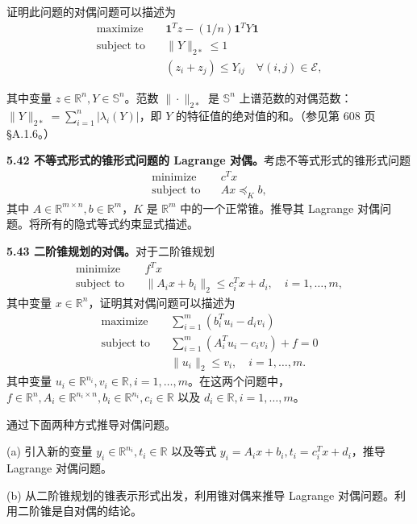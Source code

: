 \documentclass[UTF8, 12pt, fontset=fandol, oneside]{ctexart}
\begin{document}
证明此问题的对偶问题可以描述为
\[
\begin{aligned}
\text{maximize}\quad & \mathbf{1}^Tz-(1/n)\mathbf{1}^TY\mathbf{1}\\
\text{subject to}\quad & \|Y\|_{2\ast}\leq 1\\
& (z_i+z_j)\leq Y_{ij}\quad \forall (i,j)\in\mathcal{E},
\end{aligned}
\]

其中变量 $z\in\mathbb{R}^n, Y\in\mathbb{S}^n$。范数 $\|\cdot\|_{2\ast}$ 是 $\mathbb{S}^n$ 上谱范数的对偶范数：$\|Y\|_{2\ast}=\sum_{i=1}^n|\lambda_i(Y)|$，即 $Y$ 的特征值的绝对值的和。（参见第 608 页 §A.1.6。）

\noindent\textbf{5.42 不等式形式的锥形式问题的 Lagrange 对偶。}\quad 考虑不等式形式的锥形式问题
\[
\begin{aligned}
\text{minimize}\quad & c^Tx\\
\text{subject to}\quad & Ax\preceq_K b,
\end{aligned}
\]
其中 $A\in\mathbb{R}^{m\times n}, b\in\mathbb{R}^m$，$K$ 是 $\mathbb{R}^m$ 中的一个正常锥。推导其 Lagrange 对偶问题。将所有的隐式等式约束显式描述。

\noindent\textbf{5.43 二阶锥规划的对偶。}\quad 对于二阶锥规划
\[
\begin{aligned}
\text{minimize}\quad & f^Tx\\
\text{subject to}\quad & \|A_ix+b_i\|_2\leq c_i^Tx+d_i,\quad i=1,\ldots,m,
\end{aligned}
\]
其中变量 $x\in\mathbb{R}^n$，证明其对偶问题可以描述为
\[
\begin{aligned}
\text{maximize}\quad & \sum_{i=1}^m(b_i^Tu_i-d_iv_i)\\
\text{subject to}\quad & \sum_{i=1}^m(A_i^Tu_i-c_iv_i)+f=0\\
& \|u_i\|_2\leq v_i,\quad i=1,\ldots,m.
\end{aligned}
\]
其中变量 $u_i\in\mathbb{R}^{n_i}, v_i\in\mathbb{R}, i=1,\ldots,m$。在这两个问题中，$f\in\mathbb{R}^n, A_i\in\mathbb{R}^{n_i\times n}, b_i\in\mathbb{R}^{n_i}, c_i\in\mathbb{R}$ 以及 $d_i\in\mathbb{R}, i=1,\ldots,m$。

通过下面两种方式推导对偶问题。

(a) 引入新的变量 $y_i\in\mathbb{R}^{n_i}, t_i\in\mathbb{R}$ 以及等式 $y_i=A_ix+b_i, t_i=c_i^Tx+d_i$，推导 Lagrange 对偶问题。

(b) 从二阶锥规划的锥表示形式出发，利用锥对偶来推导 Lagrange 对偶问题。利用二阶锥是自对偶的结论。
\end{document}
